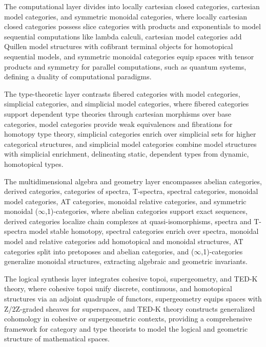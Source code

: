 \documentclass{article}
\begin{document}
The computational layer divides into locally cartesian closed categories,
cartesian model categories, and symmetric monoidal categories, where locally
cartesian closed categories possess slice categories with products and
exponentials to model sequential computations like lambda calculi, cartesian
model categories add Quillen model structures with cofibrant terminal objects
for homotopical sequential models, and symmetric monoidal categories equip
spaces with tensor products and symmetry for parallel computations, such as
quantum systems, defining a duality of computational paradigms.

The type-theoretic layer contrasts fibered categories with model categories,
simplicial categories, and simplicial model categories, where fibered categories
support dependent type theories through cartesian morphisms over base categories,
model categories provide weak equivalences and fibrations for homotopy type theory,
simplicial categories enrich over simplicial sets for higher categorical structures,
and simplicial model categories combine model structures with simplicial enrichment,
delineating static, dependent types from dynamic, homotopical types.

The multidimensional algebra and geometry layer encompasses abelian categories,
derived categories, categories of spectra, T-spectra, spectral categories,
monoidal model categories, AT categories, monoidal relative categories,
and symmetric monoidal ($\infty$,1)-categories, where abelian categories support
exact sequences, derived categories localize chain complexes at quasi-isomorphisms,
spectra and T-spectra model stable homotopy, spectral categories enrich over spectra,
monoidal model and relative categories add homotopical and monoidal structures,
AT categories split into pretoposes and abelian categories, and ($\infty$,1)-categories
generalize monoidal structures, extracting algebraic and geometric invariants.

The logical synthesis layer integrates cohesive topoi, supergeometry, and TED-K theory,
where cohesive topoi unify discrete, continuous, and homotopical structures via an
adjoint quadruple of functors, supergeometry equips spaces with Z/2Z-graded sheaves
for superspaces, and TED-K theory constructs generalized cohomology in cohesive or
supergeometric contexts, providing a comprehensive framework for category and type
theorists to model the logical and geometric structure of mathematical spaces.

\end{document}
